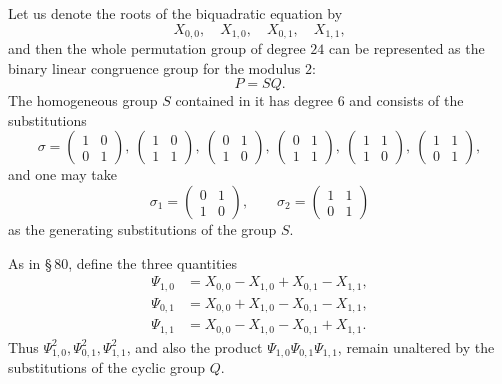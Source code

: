\documentclass[11pt]{article}
\providecommand{\mat}[4]{\begin{pmatrix}#1&#2\\#3&#4\end{pmatrix}}
\providecommand{\mat}[4]{\begin{pmatrix}#1&#2\\#3&#4\end{pmatrix}}
\providecommand{\mat}[1]{\begin{pmatrix}#1\end{pmatrix}}
\begin{document}
Let us denote the roots of the biquadratic equation by
\begin{equation}
 X_{0,0},\quad X_{1,0},\quad X_{0,1},\quad X_{1,1},
 \tag{1}
\end{equation}
and then the whole permutation group of degree $24$ can be represented as the binary linear congruence group for the modulus $2$:
\begin{equation}
 P=SQ.
 \tag{2}
\end{equation}
The homogeneous group $S$ contained in it has degree $6$ and consists of the substitutions
\begin{equation}
 \sigma=\mat{1}{0}{0}{1},\ \mat{1}{0}{1}{1},\ \mat{0}{1}{1}{0},\ \mat{0}{1}{1}{1},\ \mat{1}{1}{1}{0},\ \mat{1}{1}{0}{1},
 \tag{3}
\end{equation}
and one may take
\begin{equation}
 \sigma_1=\mat{0}{1}{1}{0},
 \qquad
 \sigma_2=\mat{1}{1}{0}{1}
 \tag{4}
\end{equation}
as the generating substitutions of the group $S$.

As in \S\,80, define the three quantities
\begin{equation}
\begin{aligned}
 \Psi_{1,0}&=X_{0,0}-X_{1,0}+X_{0,1}-X_{1,1},\\
 \Psi_{0,1}&=X_{0,0}+X_{1,0}-X_{0,1}-X_{1,1},\\
 \Psi_{1,1}&=X_{0,0}-X_{1,0}-X_{0,1}+X_{1,1}.
\end{aligned}
\tag{5}
\end{equation}
Thus $\Psi_{1,0}^2,\Psi_{0,1}^2,\Psi_{1,1}^2$, and also the product $\Psi_{1,0}\Psi_{0,1}\Psi_{1,1}$, remain unaltered by the substitutions of the cyclic group $Q$.
\end{document}
